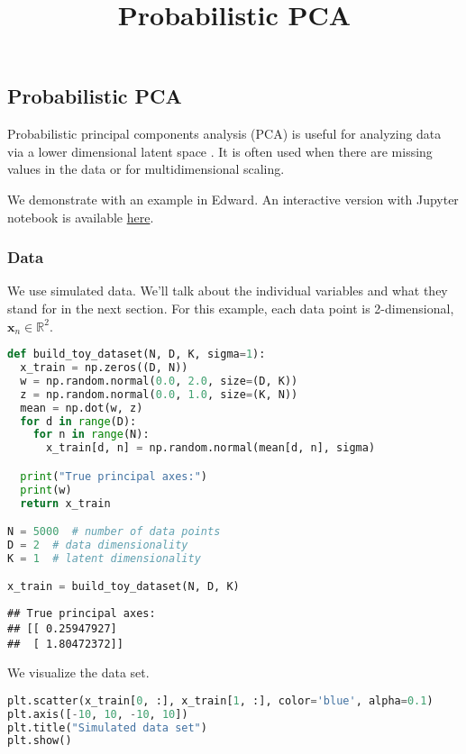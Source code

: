 \title{Probabilistic PCA}

\subsection{Probabilistic PCA}

Probabilistic principal components analysis (PCA) is
useful for analyzing data via a lower dimensional latent space
\citep{tipping1999probabilistic}. It is often
used when there are missing values in the data or for multidimensional
scaling.

We demonstrate with an example in Edward.
An interactive version with Jupyter notebook is available
\href{http://nbviewer.jupyter.org/github/blei-lab/edward/blob/master/docs/notebooks/probabilistic_pca.ipynb}{here}.

\subsubsection{Data}

We use simulated data. We'll talk about the individual variables and
what they stand for in the next section. For this example, each data
point is 2-dimensional, $\mathbf{x}_n\in\mathbb{R}^2$.

\begin{lstlisting}[language=Python]
def build_toy_dataset(N, D, K, sigma=1):
  x_train = np.zeros((D, N))
  w = np.random.normal(0.0, 2.0, size=(D, K))
  z = np.random.normal(0.0, 1.0, size=(K, N))
  mean = np.dot(w, z)
  for d in range(D):
    for n in range(N):
      x_train[d, n] = np.random.normal(mean[d, n], sigma)

  print("True principal axes:")
  print(w)
  return x_train

N = 5000  # number of data points
D = 2  # data dimensionality
K = 1  # latent dimensionality

x_train = build_toy_dataset(N, D, K)
\end{lstlisting}

\begin{lstlisting}
## True principal axes:
## [[ 0.25947927]
##  [ 1.80472372]]
\end{lstlisting}

We visualize the data set.

\begin{lstlisting}[language=Python]
plt.scatter(x_train[0, :], x_train[1, :], color='blue', alpha=0.1)
plt.axis([-10, 10, -10, 10])
plt.title("Simulated data set")
plt.show()
\end{lstlisting}

